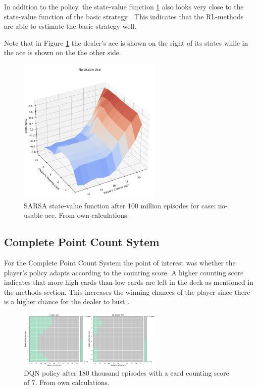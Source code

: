 \documentclass[conference]{IEEEtran}
\begin{document}
In addition to the policy, the state-value function \ref{fig:sarsa-state-value-basic} also looks very close to the state-value function of the basic strategy \cite{b4}.
This indicates that the RL-methods are able to estimate the basic strategy well. 

Note that in Figure \ref{fig:sarsa-state-value-basic} the dealer's ace is shown on the right of its states while in \cite{b4} the ace is shown on the the other side. 

\begin{figure}
	\centering
	\includegraphics[width=70mm]{figures/MC/basic-100-million/value-function-no-usuable-ace.png}
	\caption{SARSA state-value function after 100 million episodes for case: no-usable ace. From own calculations.}
	\label{fig:sarsa-state-value-basic}
\end{figure}


\subsection{Complete Point Count Sytem}
For the Complete Point Count System the point of interest was whether the player's policy adapts according to the counting score.
A higher counting score indicates that more high cards than low cards are left in the deck as mentioned in the methods section.
This increases the winning chances of the player since there is a higher chance for the dealer to bust \cite{b1}.  

\begin{figure}
	\centering
	\includegraphics[width=70mm]{figures/DQN/counting-180000/policy-counting-7.png}
	\caption{DQN policy after 180 thousand episodes with a card counting score of 7. From own calculations.}
	\label{fig:dqn-card-counting-7}
\end{figure}
\end{document}
